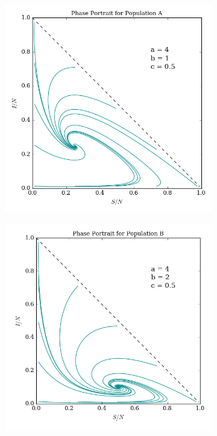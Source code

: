 \documentclass[prb,aps,twocolumn,showpacs,10pt]{revtex4-1}
\begin{document}
\begin{figure}
\centering
\begin{subfigure}{.5\textwidth}
  \centering
  \includegraphics[width=\linewidth]{phaseportrait_A.png}
  \label{fig:sub1}
\end{subfigure}%
\begin{subfigure}{.5\textwidth}
  \centering
  \includegraphics[width=\linewidth]{phaseportrait_B.png}
  \label{fig:sub2}
\end{subfigure}
\label{fig:test}


\end{figure}
\end{document}
